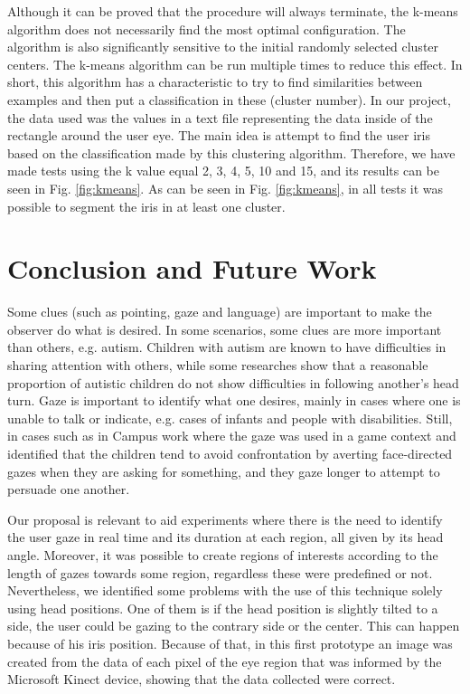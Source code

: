 \documentclass[10pt, conference]{IEEEtran}
\begin{document}
	Although it can be proved that the procedure will always terminate, the k-means algorithm does not necessarily find the most optimal configuration. 
	The algorithm is also significantly sensitive to the initial randomly selected cluster centers. 
	The k-means algorithm can be run multiple times to reduce this effect.
	In short, this algorithm has a characteristic to try to find similarities between examples and then put a classification in these (cluster number). In our project, the data used was the values in a text file representing the data inside of the rectangle around the user eye. 
	The main idea is attempt to find the user iris based on the classification made by this clustering algorithm. 
	Therefore, we have made tests using the k value equal 2, 3, 4, 5, 10 and 15, and its results can be seen in Fig. \ref{fig:kmeans}.
	As can be seen in Fig. \ref{fig:kmeans}, in all tests it was possible to segment the iris in at least one cluster.


\section{Conclusion and Future Work} \label{sec:conclusionAndFutureWork}
	Some clues (such as pointing, gaze and language) are important to make the observer do what is desired. 
	In some scenarios, some clues are more important than others, e.g. autism.
	Children with autism are known to have difficulties in sharing attention with others, while some researches \cite{14} show that a reasonable proportion of autistic children do not show difficulties in following another's head turn.
	Gaze is important to identify what one desires, mainly in cases where one is unable to talk or indicate, e.g. cases of infants and people with disabilities.
	Still, in cases such as in Campus work where the gaze was used in a game context and identified that the children tend to avoid confrontation by averting face-directed gazes when they are asking for something, and they gaze longer to attempt to persuade one another.

	Our proposal is relevant to aid experiments where there is the need to identify the user gaze in real time and its duration at each region, all given by its head angle.
	Moreover, it was possible to create regions of interests according to the length of gazes towards some region, regardless these were predefined or not.
	Nevertheless, we identified some problems with the use of this technique solely using head positions. 
	One of them is if the head position is slightly tilted to a side, the user could be gazing to the contrary side or the center. 
	This can happen because of his iris position. 
	Because of that, in this first prototype an image was created from the data of each pixel of the eye region that was informed by the Microsoft Kinect device, showing that the data collected were correct. 
\end{document}
